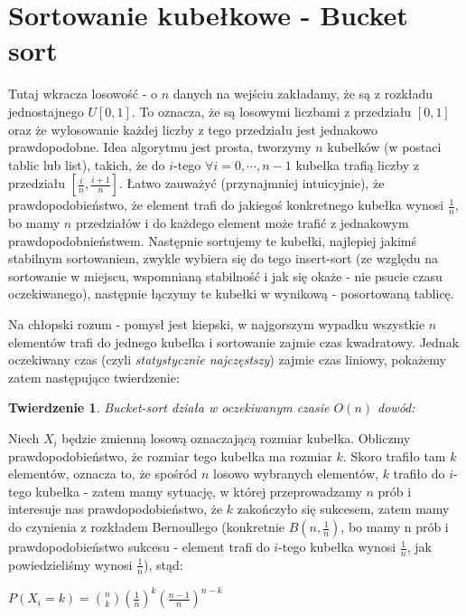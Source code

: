 \documentclass[../main.tex]{subfiles} %
\begin{document}
\section{Sortowanie kubełkowe - Bucket sort}

Tutaj wkracza losowość - o \(n\) danych na wejściu zakładamy, że są z rozkładu jednostajnego \(U[0,1]\). To oznacza, że są losowymi liczbami z przedziału \([0, 1]\) oraz że wylosowanie każdej liczby z tego przedziału jest jednakowo prawdopodobne. Idea algorytmu jest prosta, tworzymy \(n\) kubełków (w postaci tablic lub list), takich, że do \(i\)-tego \(\forall i = 0, \cdots, n - 1\) kubełka trafią liczby z przedziału \([\frac{i}{n}, \frac{i+1}{n}]\). Łatwo zauważyć (przynajmniej intuicyjnie), że prawdopodobieństwo, że element trafi do jakiegoś konkretnego kubełka wynosi \(\frac{1}{n}\), bo mamy \(n\) przedziałów i do każdego element może trafić z jednakowym prawdopodobnieństwem. Następnie sortujemy te kubełki, najlepiej
jakimś stabilnym sortowaniem, zwykle wybiera się do tego insert-sort (ze względu na sortowanie w miejscu, wspomnianą stabilność i jak się okaże - nie psucie czasu oczekiwanego), następnie łączymy te kubełki w wynikową - posortowaną tablicę.

Na chłopski rozum - pomysł jest kiepski, w najgorszym wypadku wszystkie \(n\) elementów trafi do jednego kubełka i sortowanie zajmie czas kwadratowy. Jednak oczekiwany czas (czyli \textit{statystycznie najczęstszy}) zajmie czas liniowy, pokażemy zatem następujące twierdzenie:

\newtheorem{theorem}{Twierdzenie}
\begin{theorem}
Bucket-sort działa w oczekiwanym czasie \(O(n)\)
\newline
dowód:
\end{theorem}
Niech \(X_i\) będzie zmienną losową oznaczającą rozmiar kubełka. Obliczmy prawdopodobieństwo, że rozmiar tego kubełka ma rozmiar \(k\). Skoro trafiło tam \(k\) elementów, oznacza to, że spośród \(n\) losowo wybranych elementów, \(k\) trafiło do \(i\)-tego kubełka - zatem mamy sytuację, w której przeprowadzamy \(n\) prób i interesuje nas prawdopodobieństwo, że \(k\) zakończyło się sukcesem, zatem mamy do czynienia z rozkładem Bernoullego (konkretnie \(B(n, \frac{1}{n})\), bo mamy n prób i prawdopodobieństwo sukcesu - element trafi do \(i\)-tego kubełka wynosi \(\frac{1}{n}\), jak powiedzieliśmy wynosi \(\frac{1}{n}\)), stąd:

\(P(X_i = k) = {n \choose k}(\frac{1}{n})^k(\frac{n - 1}{n})^{n - k}\)
\end{document}
